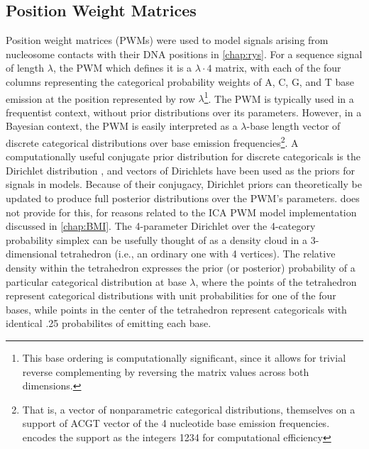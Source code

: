 \subsection{Position Weight Matrices}
\label{ssec:PWM}
Position weight matrices (PWMs) were used to model signals arising from nucleosome contacts with their DNA positions in \autoref{chap:rys}. For a sequence signal of length $\lambda$, the PWM which defines it is a $\lambda \cdot 4$ matrix, with each of the four columns representing the categorical probability weights of A, C, G, and T base emission at the position represented by row $\lambda$\footnote{This base ordering is computationally significant, since it allows for trivial reverse complementing by reversing the matrix values across both dimensions.}. The PWM is typically used in a frequentist context, without prior distributions over its parameters. However, in a Bayesian context, the PWM is easily interpreted as a $\lambda$-base length vector of discrete categorical distributions over base emission frequencies\footnote{That is, a vector of nonparametric categorical distributions, themselves on a support of ACGT vector of the 4 nucleotide base emission frequencies.  encodes the support as the integers 1234 for computational efficiency}. A computationally useful conjugate prior distribution for discrete categoricals is the Dirichlet distribution \cite{Minka2000}, and vectors of Dirichlets have been used as the priors for signals in  models. Because of their conjugacy, Dirichlet priors can theoretically be updated to produce full posterior distributions over the PWM's parameters.  does not provide for this, for reasons related to the ICA PWM model implementation discussed in \autoref{chap:BMI}. The 4-parameter Dirichlet over the 4-category probability simplex can be usefully thought of as a density cloud in a 3-dimensional tetrahedron (i.e., an ordinary one with 4 vertices). The relative density within the tetrahedron expresses the prior (or posterior) probability of a particular categorical distribution at base $\lambda$, where the points of the tetrahedron represent categorical distributions with unit probabilities for one of the four bases, while points in the center of the tetrahedron represent categoricals with identical .25 probabilites of emitting each base. 

